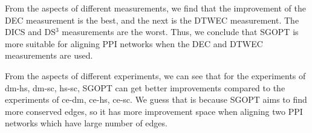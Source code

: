 \documentclass{bioinfo}
\theoremstyle{definition}
\begin{document}
From the aspects of different measurements, we find that the improvement of the DEC measurement is the best, and the next is the DTWEC measurement. The DICS and DS$^3$ measurements are the worst. Thus, we conclude that SGOPT is more suitable for aligning PPI networks when the DEC and DTWEC measurements are used.

From the aspects of different experiments, we can see that for the experiments of dm-hs, dm-sc, hs-sc, SGOPT can get better improvements compared to the experiments of ce-dm, ce-hs, ce-sc. We guess that is because SGOPT aims to find more conserved edges, so it has more improvement space when aligning two PPI networks which have large number of edges.
\begin{figure}[!t]
\end{figure}
\end{document}
